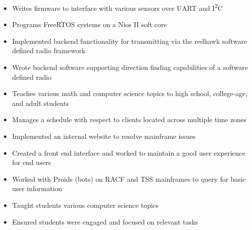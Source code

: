 \documentclass[10pt,a4paper,ragged2e,withhyper]{altacv}
\begin{document}
\begin{paracol}{2}


\begin{itemize}
\item Writes firmware to interface with various sensors over UART and I\textsuperscript{2}C
\item Programs FreeRTOS systems on a Nios II soft core
\item Implemented backend functionality for transmitting via the redhawk software defined radio framework
\item Wrote backend software supporting direction finding capabilities of a software defined radio
\end{itemize}

\divider{}

\begin{itemize}
\item Teaches various math and computer science topics to high school, college-age, and adult students
\item Manages a schedule with respect to clients located across multiple time zones
\end{itemize}

\divider{}

\begin{itemize}
\item Implemented an internal website to resolve mainframe issues
\item Created a front end interface and worked to maintain a good user experience for end users
\item Worked with Proids (bots) on RACF and TSS mainframes to query for basic user information
\end{itemize}


\begin{itemize}
\item Taught students various computer science topics
\item Ensured students were engaged and focused on relevant tasks
\end{itemize}


\end{paracol}
\end{document}
